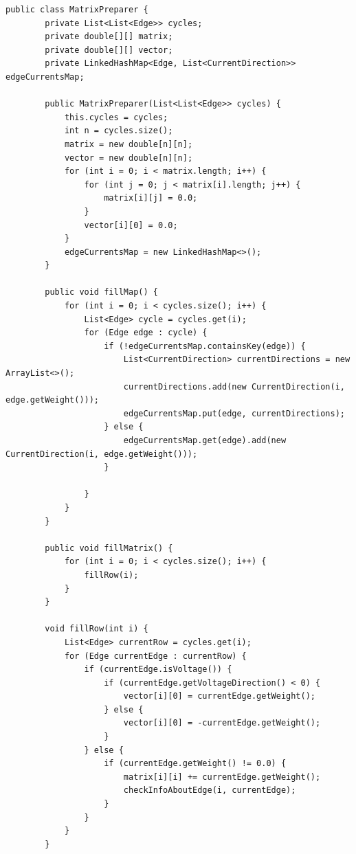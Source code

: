 \documentclass[12pt,a4paper]{article}
\begin{document}
\begin{Verbatim}[fontsize=\small]
    public class MatrixPreparer {
        private List<List<Edge>> cycles;
        private double[][] matrix;
        private double[][] vector;
        private LinkedHashMap<Edge, List<CurrentDirection>> edgeCurrentsMap;

        public MatrixPreparer(List<List<Edge>> cycles) {
            this.cycles = cycles;
            int n = cycles.size();
            matrix = new double[n][n];
            vector = new double[n][n];
            for (int i = 0; i < matrix.length; i++) {
                for (int j = 0; j < matrix[i].length; j++) {
                    matrix[i][j] = 0.0;
                }
                vector[i][0] = 0.0;
            }
            edgeCurrentsMap = new LinkedHashMap<>();
        }

        public void fillMap() {
            for (int i = 0; i < cycles.size(); i++) {
                List<Edge> cycle = cycles.get(i);
                for (Edge edge : cycle) {
                    if (!edgeCurrentsMap.containsKey(edge)) {
                        List<CurrentDirection> currentDirections = new ArrayList<>();
                        currentDirections.add(new CurrentDirection(i, edge.getWeight()));
                        edgeCurrentsMap.put(edge, currentDirections);
                    } else {
                        edgeCurrentsMap.get(edge).add(new CurrentDirection(i, edge.getWeight()));
                    }

                }
            }
        }

        public void fillMatrix() {
            for (int i = 0; i < cycles.size(); i++) {
                fillRow(i);
            }
        }

        void fillRow(int i) {
            List<Edge> currentRow = cycles.get(i);
            for (Edge currentEdge : currentRow) {
                if (currentEdge.isVoltage()) {
                    if (currentEdge.getVoltageDirection() < 0) {
                        vector[i][0] = currentEdge.getWeight();
                    } else {
                        vector[i][0] = -currentEdge.getWeight();
                    }
                } else {
                    if (currentEdge.getWeight() != 0.0) {
                        matrix[i][i] += currentEdge.getWeight();
                        checkInfoAboutEdge(i, currentEdge);
                    }
                }
            }
        }


\end{Verbatim}
\end{document}
